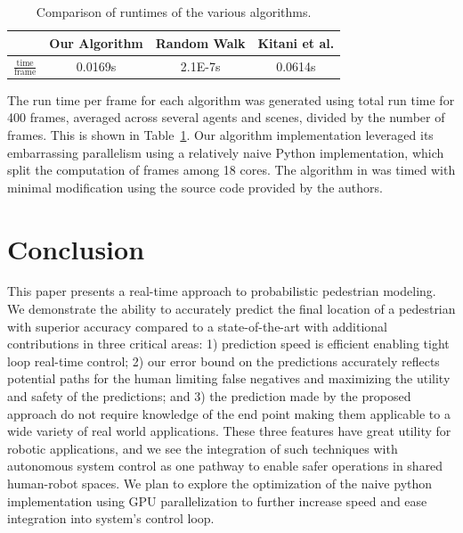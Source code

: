 \documentclass[letterpaper,10pt,conference]{ieeeconf}
\begin{document}
\begin{table}
	\begin{center}
		\caption{Comparison of runtimes of the various algorithms.}
		\label{tab:time}
		\renewcommand{\arraystretch}{1.5}%
		\begin{tabular}{||c | c c  c ||} 
			\hline
			& Our Algorithm & Random Walk & Kitani et al. \\ [0.5ex] 
			\hline 
			$\frac{\mathrm{time}}{\mathrm{frame}}$ & 0.0169s & 2.1E-7s & 0.0614s \\
			\hline
		\end{tabular}
	\end{center}
\end{table}

The run time per frame for each algorithm was generated using total run time for 400 frames, averaged across several agents and scenes, divided by the number of frames. 
This is shown in Table~\ref{tab:time}. 
Our algorithm implementation leveraged its embarrassing parallelism using a relatively naive Python implementation, which split the computation of frames among 18 cores. 
The algorithm in \cite{Kitani2012} was timed with minimal modification using the source code provided by the authors. 


\section{Conclusion} 
\label{sec:conclusion}
This paper presents a real-time approach to probabilistic pedestrian modeling. 
We demonstrate the ability to accurately predict the final location of a pedestrian with superior accuracy compared to a state-of-the-art with additional contributions in three critical areas: 1) prediction speed is efficient enabling tight loop real-time control;  2) our error bound on the predictions accurately reflects potential paths for the human limiting false negatives and maximizing the utility and safety of the predictions; and 3) the prediction made by the proposed approach do not require knowledge of the end point  making them applicable to a wide variety of real world applications. 
These three features have great utility for robotic applications, and we see the integration of such techniques with autonomous system control as one pathway to enable safer operations in shared human-robot spaces. 
We plan to explore the optimization of the naive python implementation using GPU parallelization to further increase speed and ease integration into system's control loop. 
\end{document}
